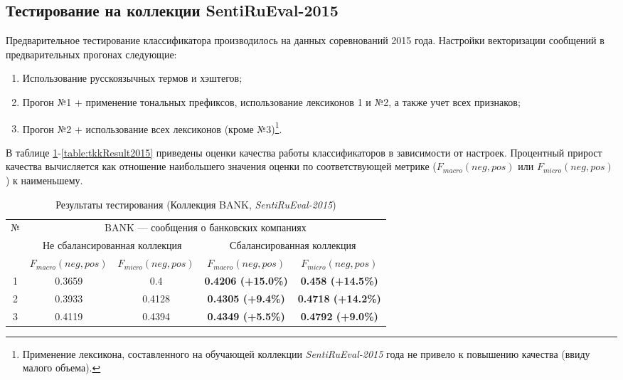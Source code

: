 \subsection{Тестирование на коллекции SentiRuEval-2015}
\label{sec:test2015}
Предварительное тестирование классификатора производилось на данных
соревнований 2015 года.
Настройки векторизации сообщений в предварительных прогонах следующие:
\begin{enumerate}
    \item Использование русскоязычных термов и хэштегов;
    \item Прогон №1 + применение тональных префиксов, использование лексиконов 1
        и №2, а также учет всех признаков;
    \item Прогон №2 + использование всех лексиконов (кроме №3)\footnote{
        Применение лексикона, составленного на обучающей коллекции {\it SentiRuEval-2015}
        года не привело к повышению качества (ввиду малого объема).
    }.
\end{enumerate}

В таблице \ref{table:bankResult2015}-\ref{table:tkkResult2015} приведены оценки
качества работы классификаторов в зависимости от настроек.
Процентный прирост качества вычисляется как отношение наибольшего значения оценки по
соответствующей метрике ($F_{macro}(neg, pos)$ или $F_{micro}(neg, pos)$) к
наименьшему.

\begin{table}[ht!]
\centering
\caption{Результаты тестирования (Коллекция BANK, {\it SentiRuEval-2015})}
\label{table:bankResult2015}
\begin{tabular}{|c|c|c|c|c|}
\hline
\multirow{3}{*}{№} & \multicolumn{4}{c|}{BANK --- сообщения о банковских компаниях}                                                               \\ \cline{2-5}
                   & \multicolumn{2}{c|}{Не сбалансированная коллекция} & \multicolumn{2}{c|}{Сбалансированная коллекция} \\ \cline{2-5}
                   & $F_{macro}(neg, pos)$    & $F_{micro}(neg, pos)$   & $F_{macro}(neg, pos)$  & $F_{micro}(neg, pos)$  \\ \hline
1                  & 0.3659                   & 0.4                     & {\bf 0.4206 (+15.0\%)}       & {\bf 0.458 (+14.5\%) }       \\ \hline
2                  & 0.3933                   & 0.4128                  & {\bf 0.4305 (+9.4\%) }       & {\bf 0.4718 (+14.2\%)}       \\ \hline
3                  & 0.4119                   & 0.4394                  & {\bf 0.4349 (+5.5\%) }       & {\bf 0.4792 (+9.0\%) }       \\ \hline
\end{tabular}
\end{table}

